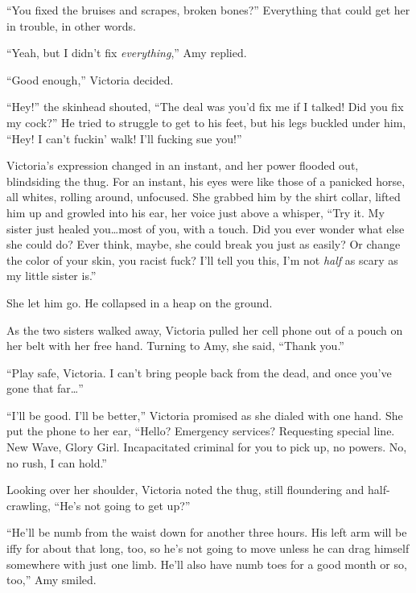 ``You fixed the bruises and scrapes, broken bones?''  Everything that could get her in trouble, in other words.



``Yeah, but I didn't fix \emph{everything},'' Amy replied.



``Good enough,'' Victoria decided.



``Hey!'' the skinhead shouted, ``The deal was you'd fix me if I talked!  Did you fix my cock?''  He tried to struggle to get to his feet, but his legs buckled under him,  ``Hey!  I can't fuckin' walk!  I'll fucking sue you!''



Victoria's expression changed in an instant, and her power flooded out, blindsiding the thug.  For an instant, his eyes were like those of a panicked horse, all whites, rolling around, unfocused.  She grabbed him by the shirt collar, lifted him up and growled into his ear, her voice just above a whisper, ``Try it.  My sister just healed you\ldots most of you, with a touch.  Did you ever wonder what else she could do?  Ever think, maybe, she could break you just as easily?  Or change the color of your skin, you racist fuck?  I'll tell you this, I'm not \emph{half} as scary as my little sister is.''



She let him go.  He collapsed in a heap on the ground.



As the two sisters walked away, Victoria pulled her cell phone out of a pouch on her belt with her free hand.  Turning to Amy, she said, ``Thank you.''



``Play safe, Victoria.  I can't bring people back from the dead, and once you've gone that far\ldots''



``I'll be good.  I'll be better,'' Victoria promised as she dialed with one hand.  She put the phone to her ear, ``Hello?  Emergency services?  Requesting special line.  New Wave, Glory Girl.  Incapacitated criminal for you to pick up, no powers.  No, no rush, I can hold.''



Looking over her shoulder, Victoria noted the thug, still floundering and half-crawling, ``He's not going to get up?''



``He'll be numb from the waist down for another three hours.  His left arm will be iffy for about that long, too, so he's not going to move unless he can drag himself somewhere with just one limb.  He'll also have numb toes for a good month or so, too,'' Amy smiled.



